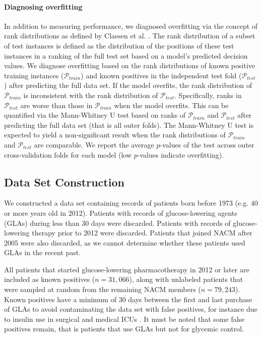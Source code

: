\paragraph{Diagnosing overfitting} 
In addition to measuring performance, we diagnosed overfitting via the concept of rank distributions as defined by Claesen et al. \citep{claesen2015icml}. The rank distribution of a subset of test instances is defined as the distribution of the positions of these test instances in a ranking of the full test set based on a model's predicted decision values. We diagnose overfitting based on the rank distributions of known positive training instances ($\mathcal{P}_{train}$) and known positives in the independent test fold ($\mathcal{P}_{test}$) after predicting the full data set. If the model overfits, the rank distribution of $\mathcal{P}_{train}$ is inconsistent with the rank distribution of $\mathcal{P}_{test}$. Specifically, ranks in $\mathcal{P}_{test}$ are worse than those in $\mathcal{P}_{train}$ when the model overfits. This can be quantified via the Mann-Whitney U test \citep{mann1947test} based on ranks of $\mathcal{P}_{train}$ and $\mathcal{P}_{test}$ after predicting the full data set (that is all outer folds). The Mann-Whitney U test is expected to yield a non-significant result when the rank distributions of $\mathcal{P}_{train}$ and $\mathcal{P}_{test}$ are comparable. We report the average $p$-values of the test across outer cross-validation folds for each model (low $p$-values indicate overfitting).


\subsection{Data Set Construction} \label{data}
We constructed a data set containing records of patients born before 1973 (e.g. $40$ or more years old in 2012). Patients with records of glucose-lowering agents (GLAs) during less than 30 days were discarded. Patients with records of glucose-lowering therapy prior to 2012 were discarded. Patients that joined NACM after 2005 were also discarded, as we cannot determine whether these patients used GLAs in the recent past. 

All patients that started glucose-lowering pharmacotherapy in 2012 or later are included as known positives ($n=31,066$), along with unlabeled patients that were sampled at random from the remaining NACM members ($n=79,243$). Known positives have a minimum of 30 days between the first and last purchase of GLAs to avoid contaminating the data set with false positives, for instance due to insulin use in surgical and medical ICUs \citep{van2001intensive, van2006intensive}. It must be noted that some false positives remain, that is patients that use GLAs but not for glycemic control.

